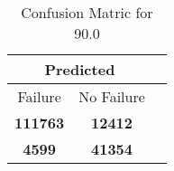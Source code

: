 \begin{table}[] 
\label{Table: Prediction Accuracy-DMD90.0OnlySunEKF-resetReflection-Reflection} 
\caption{Confusion Matric for 90.0} 
\centering 
\begin{tabular} 
 {@{}ccc@{}} 
\toprule 
\multicolumn{2}{c}{\textbf{Predicted}}
 \\ \midrule 
\multicolumn{1}{|c|}{Failure} & 
\multicolumn{1}{c|}{No Failure}
 \\ \midrule 
\multicolumn{1}{|c|}{\color{green}\textbf{111763}} & 
\multicolumn{1}{c|}{\color{red}\textbf{12412}}
 \\ \midrule 
\multicolumn{1}{|c|}{\color{red}\textbf{4599}} & 
\multicolumn{1}{c|}{\color{green}\textbf{41354}}
 \\ \bottomrule 
\end{tabular} 
\end{table} 
